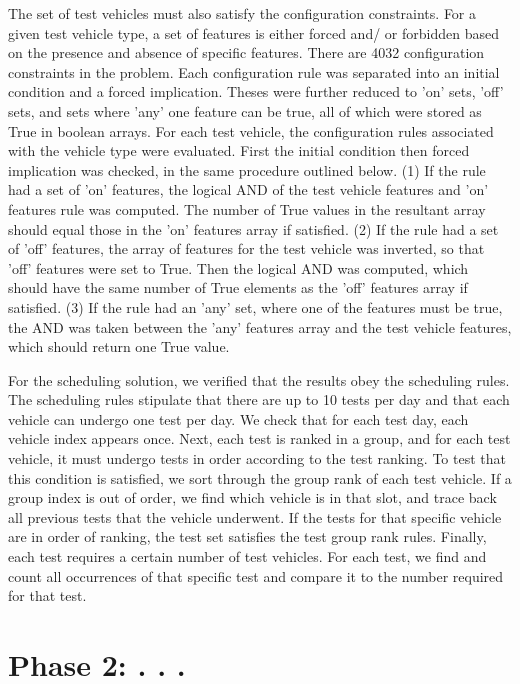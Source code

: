\documentclass[aps,pra,twocolumn,superscriptaddress,groupedaddress]{revtex4}  %
\begin{document}
The set of test vehicles must also satisfy the configuration constraints. For a
given test vehicle type, a set of features is either forced and/ or forbidden
based on the presence and absence of specific features. There are 4032
configuration constraints in the problem. Each configuration rule was separated
into an initial condition and a forced implication. Theses were further reduced
to 'on' sets, 'off' sets, and sets where 'any' one feature can be true, all of
which were stored as True in boolean arrays. For each test vehicle, the
configuration rules associated with the vehicle type were evaluated. First the 
initial condition then forced implication was checked, in the same procedure
outlined below. (1) If the rule had a set of 'on' features, the logical AND of
the test vehicle features and 'on' features rule was computed. The number of
True values in the resultant array should equal those in the 'on' features array
if satisfied. (2) If the rule had a set of 'off' features, the array of features
for the test vehicle was inverted, so that 'off' features were set to True. Then
the logical AND was computed, which should have the same number of True elements
as the 'off' features array if satisfied. (3) If the rule had an 'any' set, where
one of the features must be true, the AND was taken between the 'any' features
array and the test vehicle features, which should return one True value.

For the scheduling solution, we verified that the results obey the scheduling
rules. The scheduling rules stipulate that there are up to 10 tests per day and
that each vehicle can undergo one test per day. We check that for each test day,
each vehicle index appears once. Next, each test is ranked in a group, and for
each test vehicle, it must undergo tests in order according to the test ranking.
To test that this condition is satisfied, we sort through the group rank of each
test vehicle. If a group index is out of order, we find which vehicle is in that
slot, and trace back all previous tests that the vehicle underwent. If the tests
for that specific vehicle are in order of ranking, the test set satisfies the test
group rank rules. Finally, each test requires a certain number of test vehicles.
For each test, we find and count all occurrences of that specific test and compare
it to the number required for that test. 

\section{Phase 2: . . .}
\end{document}
